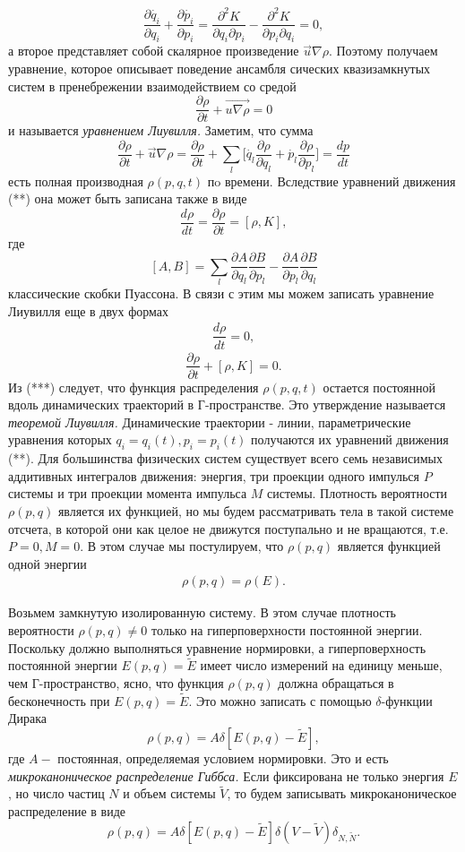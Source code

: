 \documentclass[14pt,a4paper]{scrartcl}
\begin{document}
$$\dfrac{\partial\dot{q_i}}{\partial q_i}+\dfrac{\partial\dot{p_i}}{\partial p_i} = \dfrac{\partial^2 K}{\partial q_i\partial p_i} - \dfrac{\partial^2 K}{\partial p_i\partial q_i}=0,$$
а второе представляет собой скалярное произведение $\vec{u}\nabla \rho$. Поэтому
получаем уравнение, которое описывает поведение ансамбля сических квазизамкнутых систем в пренебрежении взаимодействием со средой
$$\dfrac{\partial \rho}{\partial t} + \vec{u\nabla\rho} = 0$$
и называется \textit{уравнением Лиувилля.}
 \quad  Заметим, что сумма 
 $$\dfrac{\partial \rho}{\partial t} +\vec{u}\nabla\rho=\frac{\partial \rho}{\partial t} + \sum\limits_l \biggl[\dot{q_l}\dfrac{\partial \rho}{\partial q_l}+\dot{p_l}\dfrac{\partial\rho}{\partial p_l}\biggr] =\dfrac{dp}{dt}$$
 есть полная производная $\rho(p,q,t)$ пo времени. Вследствие уравнений движения (**) она может быть записана также в виде
 $$\dfrac{d\rho}{dt}=\dfrac{\partial\rho}{\partial t} = [\rho, K],$$
 где
 $$[A,B] = \sum\limits_l \dfrac{\partial A}{\partial q_l}\dfrac{\partial B}{\partial p_l}-\dfrac{\partial A}{\partial p_l}\dfrac{\partial B}{\partial q_l}$$
 классические скобки Пуассона. В связи с этим мы можем записать уравнение Лиувилля еще в двух формах
\begin{align}
\dfrac{d\rho}{dt} = 0,\tag{***}
\end{align}
 $$\dfrac{\partial \rho}{\partial t}+[\rho, K] = 0.$$
 Из (***) следует, что функция распределения $\rho(p,q,t)$ остается постоянной вдоль динамических траекторий в Г-пространстве. Это утверждение называется \textit{теоремой Лиувилля.} Динамические траектории - линии, параметрические уравнения которых $q_i = q_i(t), p_i =p_i(t)$ получаются их уравнений движения (**).
 \quad Для большинства физических систем существует всего семь независимых аддитивных интегралов движения: энергия, три проекции одного импулься $P$  системы и три проекции момента импульса $M$ системы. Плотность вероятности $\rho(p,q)$ является их функцией, но мы будем рассматривать тела в такой системе отсчета, в которой они как целое не движутся поступально и не вращаются, т.е. $P = 0, M = 0$. В этом случае мы постулируем, что $\rho(p,q)$ является функцией одной энергии 
 \begin{align}
 \rho(p,q)=\rho(E).\tag{1}
 \end{align}
  
  \quad Возьмем замкнутую изолированную систему. В этом случае плотность вероятности $\rho(p,q) \ne 0$ только на гиперповерхности постоянной энергии. Поскольку должно выполняться уравнение нормировки, а  гиперповерхность постоянной энергии $E(p,q) = \widetilde{E}$ имеет число измерений на единицу меньше, чем Г-пространство, ясно, что функция $\rho(p,q)$ должна обращаться в бесконечность при $E(p,q) = \widetilde{E}$. Это можно записать с помощью $\delta$-функции Дирака
  $$\rho(p,q) = A\delta[E(p,q)-\widetilde{E}],$$ 
  где $A - $ постоянная, определяемая условием нормировки. Это и есть \textit{микроканоническое распределение Гиббса.}
  \quad Если фиксирована не только энергия $E$, но число частиц $N$ и объем системы $\widetilde{V}$, то будем записывать микроканоническое распределение в виде 
  $$\rho(p,q) = A\delta[E(p,q)-\widetilde{E}]\delta(V-\widetilde{V})\delta_{N,\widetilde{N}}.$$\\
  
\end{document}
